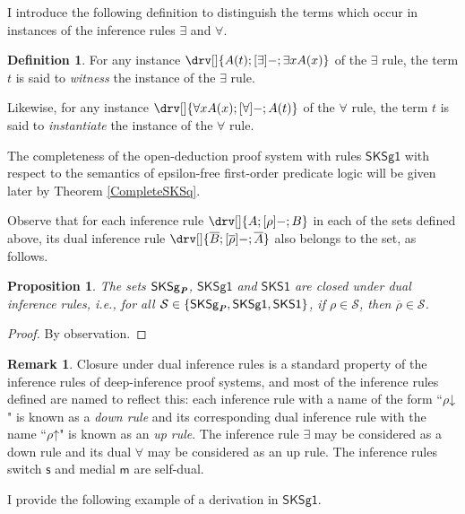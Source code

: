 \documentclass[10pt]{article}
\newtheorem{proposition}[theorem]{Proposition}
\theoremstyle{definition}\newtheorem{remark}[theorem]{Remark}
\theoremstyle{definition}\newtheorem{example}[theorem]{Example}
\theoremstyle{definition}\newtheorem{definition}[theorem]{Definition}
\newcommand{\SKSProp}{{\mathsf{SKSg}_{\textbf{\textit{P}}}}}
\newcommand{\SKSq}{{\mathsf{SKSg1}}}
\newcommand{\SKSqDecomp}{{\mathsf{SKS1}}}
\newcommand{\switch}{{\mathsf{s}}}
\newcommand{\medial}{{\mathsf{m}}}
\begin{document}
	I introduce the following definition to distinguish the terms which occur in instances of the inference rules $\exists$ and $\forall$.
	
	\begin{definition}
		For any instance $\drv[] {A(t) ; [\exists]- ; \exists x A(x)}$ of the $\exists$ rule, the term $t$ is said to \textit{witness} the instance of the $\exists$ rule.
		
		Likewise, for any instance $\drv[] {\forall x A(x) ; [\forall]- ; A(t)}$ of the $\forall$ rule, the term $t$ is said to \textit{instantiate} the instance of the $\forall$ rule.
	\end{definition}
	
	The completeness of the open-deduction proof system with rules $\SKSq$ with respect to the semantics of epsilon-free first-order predicate logic will be given later by Theorem \ref{CompleteSKSq}.
	
	Observe that for each inference rule $\drv[] {A ; [\rho]- ; B}$ in each of the sets defined above, its dual inference rule $\drv[] {\overline{B} ; [\overline{\rho}]- ; \overline{A}}$ also belongs to the set, as follows.
	
	\begin{proposition}\label{ClosureUnderDuals}
		The sets $\SKSProp$, $\SKSq$ and $\SKSqDecomp$ are closed under dual inference rules, i.e., for all $\mathcal{S} \in \{\SKSProp, \SKSq, \SKSqDecomp\}$, if $\rho \in \mathcal{S}$, then $\overline{\rho} \in \mathcal{S}$.
	\end{proposition}

	\begin{proof}
		By observation.
	\end{proof}
	
	\begin{remark}
		Closure under dual inference rules is a standard property of the inference rules of deep-inference proof systems, and most of the inference rules defined are named to reflect this: each inference rule with a name of the form ``$\rho \mathord \downarrow$" is known as a \textit{down rule} and its corresponding dual inference rule with the name ``$\rho \mathord \uparrow$" is known as an \textit{up rule}. The inference rule $\exists$ may be considered as a down rule and its dual $\forall$ may be considered as an up rule. The inference rules switch $\switch$ and medial $\medial$ are self-dual.
	\end{remark}

	I provide the following example of a derivation in $\SKSq$.
	
\end{document}
